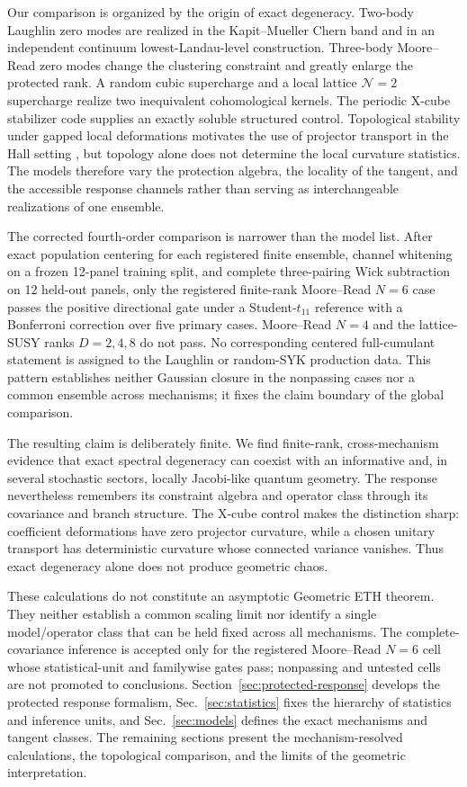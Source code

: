 Our comparison is organized by the origin of exact degeneracy.  Two-body
Laughlin zero modes are realized in the Kapit--Mueller Chern band and in an
independent continuum lowest-Landau-level construction.  Three-body
Moore--Read zero modes change the clustering constraint and greatly enlarge
the protected rank.  A random cubic supercharge and a local lattice
$\mathcal N=2$ supercharge realize two inequivalent cohomological kernels.
The periodic X-cube stabilizer code supplies an exactly soluble structured
control.  Topological stability under gapped local deformations motivates the
use of projector transport in the Hall setting \cite{hastingswen2005}, but
topology alone does not determine the local curvature statistics.  The models
therefore vary the protection algebra, the locality of the tangent, and the
accessible response channels rather than serving as interchangeable
realizations of one ensemble.

The corrected fourth-order comparison is narrower than the model list. After exact population centering for each registered finite ensemble, channel whitening on a frozen 12-panel training split, and complete three-pairing Wick subtraction on 12 held-out panels, only the registered finite-rank Moore--Read $N=6$ case passes the positive directional gate under a Student-$t_{11}$ reference with a Bonferroni correction over five primary cases. Moore--Read $N=4$ and the lattice-SUSY ranks $D=2,4,8$ do not pass. No corresponding centered full-cumulant statement is assigned to the Laughlin or random-SYK production data. This pattern establishes neither Gaussian closure in the nonpassing cases nor a common ensemble across mechanisms; it fixes the claim boundary of the global comparison.

The resulting claim is deliberately finite.  We find finite-rank,
cross-mechanism evidence that exact spectral degeneracy can coexist with an
informative and, in several stochastic sectors, locally Jacobi-like quantum
geometry.  The response nevertheless remembers its constraint algebra and
operator class through its covariance and branch structure.  The X-cube
control makes the distinction sharp: coefficient deformations have zero
projector curvature, while a chosen unitary transport has deterministic
curvature whose connected variance vanishes.  Thus exact degeneracy alone
does not produce geometric chaos.

These calculations do not constitute an asymptotic Geometric ETH theorem. They neither establish a common scaling limit nor identify a single model/operator class that can be held fixed across all mechanisms. The complete-covariance inference is accepted only for the registered Moore--Read $N=6$ cell whose statistical-unit and familywise gates pass; nonpassing and untested cells are not promoted to conclusions. Section~\ref{sec:protected-response} develops the protected response formalism, Sec.~\ref{sec:statistics} fixes the hierarchy of statistics and inference units, and Sec.~\ref{sec:models} defines the exact mechanisms and tangent classes. The remaining sections present the mechanism-resolved calculations, the topological comparison, and the limits of the geometric interpretation.
